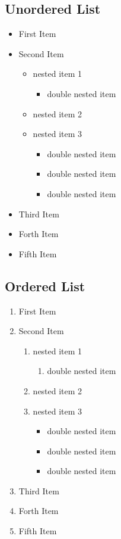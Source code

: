 \documentclass{article}
\begin{document}
    \subsection{Unordered List}
    \begin{itemize}
        \item First Item
        \item Second Item
            \begin{itemize}
                \item nested item 1
                \begin{itemize}
                    \item double nested item
                \end{itemize}
                \item nested item 2
                \item nested item 3
                \begin{itemize}
                    \item double nested item
                    \item double nested item
                    \item double nested item
                \end{itemize}
            \end{itemize}
        \item Third Item
        \item Forth Item
        \item Fifth Item
    \end{itemize}

    \subsection{Ordered List}
    \begin{enumerate}
        \item First Item
        \item Second Item
            \begin{enumerate}
                \item nested item 1
                \begin{enumerate}
                    \item double nested item
                \end{enumerate}
                \item nested item 2
                \item nested item 3
                \begin{itemize}
                    \item double nested item
                    \item double nested item
                    \item double nested item
                \end{itemize}
            \end{enumerate}
        \item Third Item
        \item Forth Item
        \item Fifth Item
    \end{enumerate}
\end{document}
